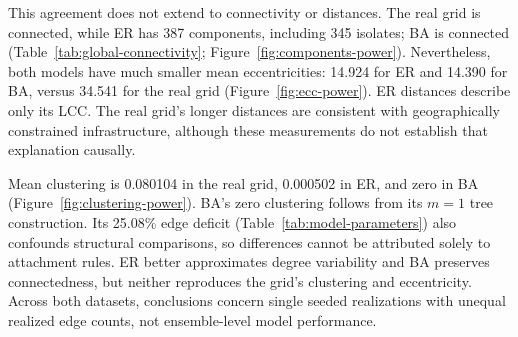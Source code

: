 This agreement does not extend to connectivity or distances. The real grid is connected, while ER has 387 components, including 345 isolates; BA is connected (Table~\ref{tab:global-connectivity}; Figure~\ref{fig:components-power}). Nevertheless, both models have much smaller mean eccentricities: 14.924 for ER and 14.390 for BA, versus 34.541 for the real grid (Figure~\ref{fig:ecc-power}). ER distances describe only its LCC. The real grid's longer distances are consistent with geographically constrained infrastructure, although these measurements do not establish that explanation causally.

Mean clustering is 0.080104 in the real grid, 0.000502 in ER, and zero in BA (Figure~\ref{fig:clustering-power}). BA's zero clustering follows from its $m=1$ tree construction. Its 25.08\% edge deficit (Table~\ref{tab:model-parameters}) also confounds structural comparisons, so differences cannot be attributed solely to attachment rules. ER better approximates degree variability and BA preserves connectedness, but neither reproduces the grid's clustering and eccentricity. Across both datasets, conclusions concern single seeded realizations with unequal realized edge counts, not ensemble-level model performance.
